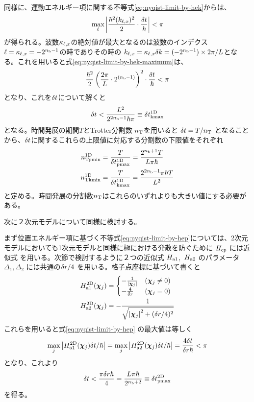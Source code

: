 \documentclass[fontsize=11pt]{jlreq}
\begin{document}
同様に、運動エネルギー項に関する不等式\eqref{eq:nyqist-limit-by-hek}からは、
\begin{equation}
\max_{\ell}{\left| \frac{\hbar^2(k_{\ell,x})^2}{2}\cdot\frac{\delta t}{\hbar} \right|} < \pi
\label{eq:nyqist-limit-by-hek-maximum}
\end{equation}
が得られる。波数$\kappa_{\ell,x}$の絶対値が最大となるのは波数のインデクス
$\ell=\kappa_{\ell,x}=-2^{n_{\mathrm{b}}-1}$の時でありその時の
$k_{\ell,x}=\kappa_{\ell,x}\delta k=(-2^{n_{\mathrm{b}}-1})\times2\pi/L$となる。これを用いると式\eqref{eq:nyqist-limit-by-hek-maximum}は、
\begin{equation}
    \frac{\hbar^2}{2}\left(\frac{2\pi}{L}\cdot 2^{(n_{\mathrm{b}}-1)}\right)^2\cdot\frac{\delta t}{\hbar} < \pi
\end{equation}
となり、これを$\delta t$について解くと
\begin{equation}
\delta t < \frac{L^2}{2^{2n_{\mathrm{b}}-1}\hbar\pi}\equiv\delta t_{\mathrm{kmax}}^{\mathrm{1D}}
 \label{eq:nyqist-limit-by-hek-final}
\end{equation}
となる。時間発展の期間$T$とTrotter分割数 $n_{\mathrm{T}}$を用いると $\delta t=T/n_{\mathrm{T}}$ となること
から、$\delta t$に関するこれらの上限値に対応する分割数の下限値をそれぞれ
\begin{align}
    n_{\mathrm{Tpmin}}^{\mathrm{1D}} &= \frac{T}{\delta t_{\mathrm{pmax}}^{\mathrm{1D}}}=\frac{2^{n_{\mathrm{b}}+1}T}{L\pi\hbar}
    \label{eq:nT-pmin-definition}\\
    n_{\mathrm{Tkmin}}^{\mathrm{1D}} &= \frac{T}{\delta t_{\mathrm{kmax}}^{\mathrm{1D}}}=\frac{2^{2n_{\mathrm{b}}-1}\pi\hbar T}{L^2}
    \label{eq:nT-kmin-definition}
\end{align}
と定める。時間発展の分割数$n_{\mathrm{T}}$はこれらのいずれよりも大きい値にする必要がある。

次に２次元モデルについて同様に検討する。

まず位置エネルギー項に基づく不等式\eqref{eq:nyqist-limit-by-hep}については、2次元
モデルにおいても1次元モデルと同様に極における発散を防ぐために $H_{\mathrm{ep}}$ には近似式
を用いる。次節で検討するように２つの近似式 $H_{\mathrm{a1}}$,\ $H_{\mathrm{a2}}$ のパラメータ
$\Delta_1,\Delta_2$ には共通の$\delta r/4$ を用いる。格子点座標に基づいて書くと
\begin{align}
H_{\mathrm{a1}}^{\mathrm{2D}}(\bm{\chi}_{j}) &= \begin{cases}
    -\frac{1}{{\left| \bm{\chi}_{j} \right|}} & (\bm{\chi}_{j}\neq0) \\
    -\frac{4}{\delta r} & (\bm{\chi}_{j}=0)
\end{cases}\\
H_{\mathrm{a2}}^{\mathrm{2D}}(\bm{\chi}_{j}) &= -\frac{1}{\sqrt{{\left| \bm{\chi}_{j} \right|}^2+(\delta r/4)^2}}
\end{align}
これらを用いると式\eqref{eq:nyqist-limit-by-hep} の最大値は等しく
\begin{equation}
\max_{j}{\left| H_{\mathrm{a1}}^{\mathrm{2D}}(\bm{\chi}_{j})\delta t/\hbar \right|}
  = \max_{j}{\left| H_{\mathrm{a2}}^{\mathrm{2D}}(\bm{\chi}_{j})\delta t/\hbar \right|}
  = \frac{4\delta t}{\delta r\hbar} < \pi
\end{equation}
となり、これより
\begin{equation}
\delta t < \frac{\pi\delta r\hbar}{4}
        =\frac{L\pi\hbar}{2^{n_{\mathrm{b}}+2}}
        \equiv\delta t_{\mathrm{pmax}}^{\mathrm{2D}}
 \label{eq:nyqist-limit-by-hep-final-2D}
\end{equation}
を得る。
\end{document}
